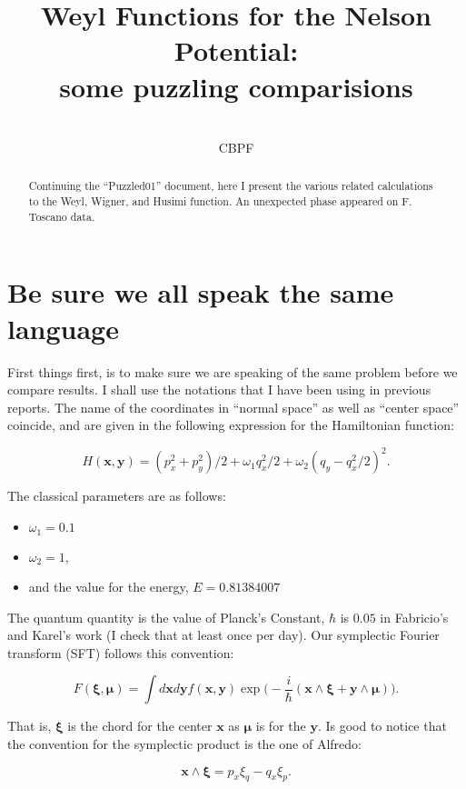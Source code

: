 \documentclass[a4paper,12pt]{article}
\title{ Weyl Functions for the Nelson Potential:\\ some puzzling comparisions}
\author{\\CBPF}
\newcommand{\ihb}{\frac{i}{\hbar}}
\newcommand{\xfase}{\mathbf{x}}
\newcommand{\yfase}{\mathbf{y}}
\newcommand{\xifase}{ {\boldsymbol{\xi}} }
\newcommand{\mufase}{ {\boldsymbol{\mu}} }
\begin{document}
\maketitle

\begin{abstract}
Continuing the ``Puzzled01'' document, here I present the various 
related calculations to the Weyl, Wigner, and Husimi function.
An unexpected phase appeared on F. Toscano data.
\end{abstract}




\section{Be sure we all speak the same language}

First things first, is to make sure we are speaking of the same
problem before we compare results. I shall use the notations that
I have been using in previous reports. The name of the coordinates
in ``normal space'' as well as ``center space'' coincide, and 
are given in the following expression for the Hamiltonian function:


\begin{equation}
H(\xfase,\yfase)=(p_x^2+p_y^2)/2+\omega_1 q_x^2/2+
\omega_2(q_y-q_x^2/2)^2.
\end{equation}

The classical parameters are as follows:
\begin{itemize}
\item  $\omega_1=0.1$ 
\item $\omega_2=1$,
\item and the value for the energy, $E=0.81384007$
\end{itemize}

The quantum quantity is the value of Planck's Constant, $\hbar$ is
$0.05$ in Fabricio's and Karel's work (I check that at least once per day).
Our symplectic Fourier transform (SFT) follows this
convention:

\begin{equation}
F(\xifase, \mufase)=\int d\xfase d \yfase
f(\xfase,\yfase)\exp \big(-\ihb (\xfase\wedge \xifase+\yfase\wedge \mufase) \big).
\end{equation}

That is, $\xifase$ is the chord for the center $\xfase$ as
$\mufase$ is for the $\yfase$.
Is good to notice that the convention for the symplectic product is
the one of Alfredo:

\begin{equation}
\xfase\wedge\xifase=p_x\xi_q - q_x \xi_p.
\end{equation}
\end{document}
